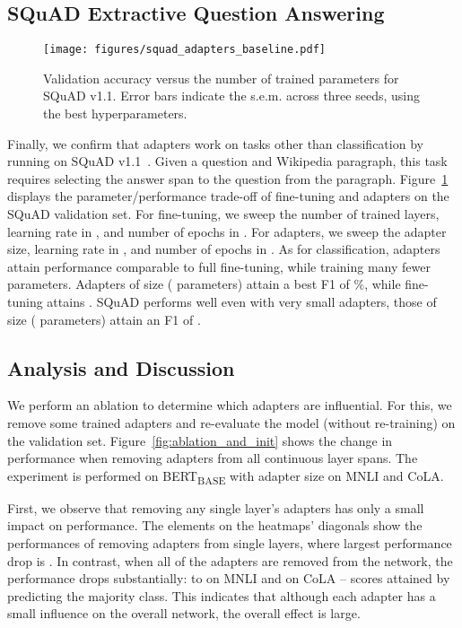 \documentclass{article}
\begin{document}
\subsection{SQuAD Extractive Question Answering}

\begin{figure}[t]
\centering
\vskip-2mm
\texttt{[image: figures/squad\_adapters\_baseline.pdf]}
\caption{
Validation accuracy versus the number of trained parameters for SQuAD v1.1.
Error bars indicate the s.e.m. across three seeds, using the best hyperparameters.
}
\label{fig:squad}
\vskip-5mm
\end{figure}

Finally, we confirm that adapters work on tasks other than classification by running on SQuAD v1.1~\citep{rajpurkar2018}.
Given a question and Wikipedia paragraph, this task requires selecting the answer span to the question from the paragraph.
Figure~\ref{fig:squad} displays the parameter/performance trade-off of fine-tuning and adapters on the SQuAD validation set.
For fine-tuning, we sweep the number of trained layers, learning rate in , and number of epochs in .
For adapters, we sweep the adapter size, learning rate in , and number of epochs in .
As for classification, adapters attain performance comparable to full fine-tuning, while training many fewer parameters.
Adapters of size  ( parameters) attain a best F1 of \%, while fine-tuning attains .
SQuAD performs well even with very small adapters, those of size  ( parameters) attain an F1 of .

\subsection{Analysis and Discussion\label{sec:discussion}}

We perform an ablation to determine which adapters are influential.
For this, we remove some trained adapters and re-evaluate the model (without re-training) on the validation set.
Figure~\ref{fig:ablation_and_init} shows the change in performance when removing adapters from all continuous layer spans.
The experiment is performed on BERT\textsubscript{BASE} with adapter size  on MNLI and CoLA.

First, we observe that removing any single layer's adapters has only a small impact on performance.
The elements on the heatmaps' diagonals show the performances of removing adapters from single layers, where largest performance drop is .
In contrast, when all of the adapters are removed from the network,
the performance drops substantially:
to  on MNLI and  on CoLA -- scores attained by predicting the majority class.
This indicates that although each adapter has a small influence on the overall network, the overall effect is large.
\end{document}
